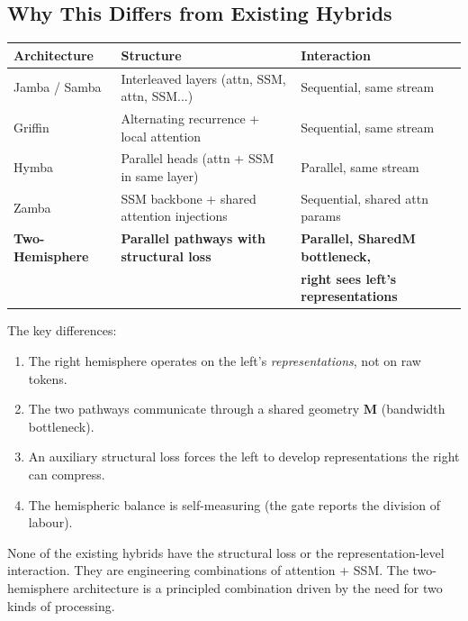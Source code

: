 \documentclass[11pt, a4paper]{article}
\newcommand{\M}{\mathbf{M}}
\theoremstyle{plain}
\theoremstyle{definition}
\theoremstyle{remark}
\begin{document}
\subsection{Why This Differs from Existing Hybrids}

\begin{center}\small
\begin{tabular}{lll}
\toprule
\textbf{Architecture} & \textbf{Structure} & \textbf{Interaction} \\
\midrule
Jamba / Samba & Interleaved layers (attn, SSM, attn, SSM...) & Sequential, same stream \\
Griffin & Alternating recurrence + local attention & Sequential, same stream \\
Hymba & Parallel heads (attn + SSM in same layer) & Parallel, same stream \\
Zamba & SSM backbone + shared attention injections & Sequential, shared attn params \\
\textbf{Two-Hemisphere} & \textbf{Parallel pathways with structural loss} & \textbf{Parallel, SharedM bottleneck,} \\
 & & \textbf{right sees left's representations} \\
\bottomrule
\end{tabular}
\end{center}

The key differences:
\begin{enumerate}[nosep]
\item The right hemisphere operates on the left's \emph{representations}, not on raw tokens.
\item The two pathways communicate through a shared geometry $\M$ (bandwidth bottleneck).
\item An auxiliary structural loss forces the left to develop representations the right can compress.
\item The hemispheric balance is self-measuring (the gate reports the division of labour).
\end{enumerate}

None of the existing hybrids have the structural loss or the representation-level interaction.
They are engineering combinations of attention + SSM.
The two-hemisphere architecture is a principled combination driven by the need for two kinds of processing.
\end{document}
